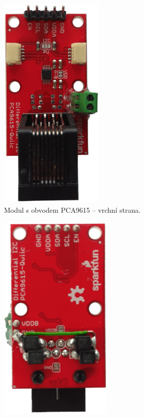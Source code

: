 \begin{figure}[H]
\centering
\begin{subfigure}{.5\textwidth}
    \centering
    \includegraphics[width=0.55\textwidth]{images/krb/modul-pca9615-i2c-sbernice.png}
    \caption{Modul s obvodem PCA9615 – vrchní strana.}
    \label{fig:modul-pca9615-i2c-sbernice}
\end{subfigure}%
\begin{subfigure}{.5\textwidth}
    \centering
    \includegraphics[width=0.6\textwidth]{images/krb/modul-pca9615-transily.png}

\end{subfigure}
\end{figure}
